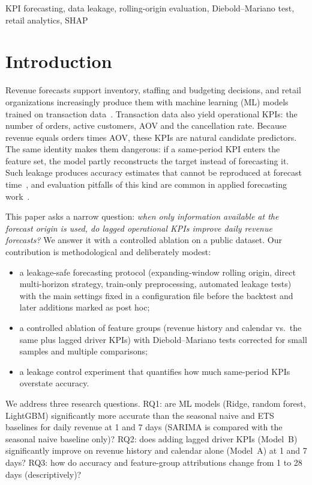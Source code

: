 \documentclass[conference]{IEEEtran}
\begin{document}
\begin{IEEEkeywords}
KPI forecasting, data leakage, rolling-origin evaluation, Diebold--Mariano test, retail analytics, SHAP
\end{IEEEkeywords}

\section{Introduction}
Revenue forecasts support inventory, staffing and budgeting decisions, and retail organizations increasingly
produce them with machine learning (ML) models trained on transaction data~\cite{fildes2022}. Transaction
data also yield operational KPIs: the number of orders, active customers, AOV and the cancellation rate.
Because revenue equals orders times AOV, these KPIs are natural candidate predictors. The same identity makes
them dangerous: if a same-period KPI enters the feature set, the model partly reconstructs the target instead
of forecasting it. Such leakage produces accuracy estimates that cannot be reproduced at forecast
time~\cite{kaufman2012leakage}, and evaluation pitfalls of this kind are common in applied forecasting
work~\cite{hewamalage2023}.

This paper asks a narrow question: \emph{when only information available at the forecast origin is used, do
lagged operational KPIs improve daily revenue forecasts?} We answer it with a controlled ablation on a
public dataset. Our contribution is methodological and deliberately modest:
\begin{itemize}
\item a leakage-safe forecasting protocol (expanding-window rolling origin, direct multi-horizon strategy,
train-only preprocessing, automated leakage tests) with the main settings fixed in a configuration
file before the backtest and later additions marked as post hoc;
\item a controlled ablation of feature groups (revenue history and calendar vs.\ the same plus lagged driver
KPIs) with Diebold--Mariano tests corrected for small samples and multiple comparisons;
\item a leakage control experiment that quantifies how much same-period KPIs overstate accuracy.
\end{itemize}
We address three research questions. RQ1: are ML models (Ridge, random forest, LightGBM) significantly more
accurate than the seasonal naive and ETS baselines for daily revenue at 1 and 7 days (SARIMA is compared with
the seasonal naive baseline only)? RQ2: does adding lagged driver
KPIs (Model~B) significantly improve on revenue history and calendar alone (Model~A) at 1 and 7 days? RQ3: how
do accuracy and feature-group attributions change from 1 to 28 days (descriptively)?
\end{document}
